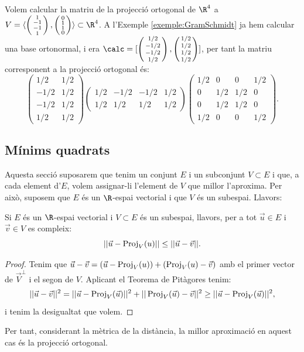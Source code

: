 \begin{exemple}
Volem calcular la matriu de la projecció ortogonal de $\R^4$ a $V=\langle \smat{1\\-1\\-1\\1}, \smat{0\\1\\1\\0}\rangle \subset \R^4$. A l'Exemple \ref{exemple:GramSchmidt} ja hem calcular una base ortonormal, i era  $\calc=[\smat{1/2\\-1/2\\-1/2\\1/2},\smat{1/2\\1/2\\1/2\\1/2}]$, per tant la matriu corresponent a la projecció ortogonal és:
\[
\begin{pmatrix}
1/2 & 1/2 \\ -1/2 & 1/2 \\ -1/2 & 1/2 \\ 1/2 & 1/2
\end{pmatrix}
\begin{pmatrix}
1/2 & -1/2 & -1/2 & 1/2 \\ 1/2 & 1/2 & 1/2 & 1/2 
\end{pmatrix}
\begin{pmatrix}
1/2 & 0 & 0 & 1/2 \\
0 & 1/2 & 1/2 & 0 \\
0 & 1/2 & 1/2 & 0 \\
1/2 & 0 & 0 & 1/2
\end{pmatrix}.
\]
\end{exemple}

\subsection{Mínims quadrats}
Aquesta secció suposarem que tenim un conjunt $E$ i un subconjunt $V\subset E$ i que, a cada element d'$E$, volem assignar-li l'element de $V$ que millor l'aproxima. Per això, suposem que $E$ és un $\R$-espai vectorial i que $V$ és un subespai. Llavors:
\begin{proposicio}\label{prop:proj_com_aprox}
Si $E$ és un $\R$-espai vectorial i $V \subset E$ és un subespai, llavors, per a tot $\vec u \in E$ i $\vec v\in V$ es compleix:
\[
||\vec u - \operatorname{Proj}_V(u)|| \leq ||\vec u - \vec v||.
\]
\end{proposicio}
\begin{proof}
Tenim que $\vec u - \vec v = (\vec u - \operatorname{Proj}_V(u)) + (\operatorname{Proj}_V(u) - \vec v)$ amb el primer vector de $\vec V^\perp$ i el segon de $V$. Aplicant el Teorema de Pitàgores tenim:
\[
||\vec u - \vec v||^2= ||\vec u - \operatorname{Proj}_V(\vec u)||^2 + ||\operatorname{Proj}_V(\vec u) - \vec v||^2 \geq ||\vec u - \operatorname{Proj}_V(\vec u)||^2 ,
\]
i tenim la desigualtat que volem.
\end{proof}
Per tant, considerant la mètrica de la distància, la millor aproximació en aquest cas és la projecció ortogonal.

